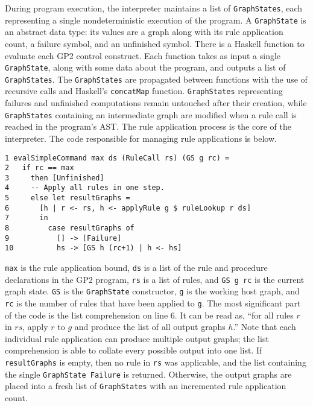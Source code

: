 During program execution, the interpreter maintains a list of \texttt{GraphStates}, each representing a single nondeterministic execution of the program. A \texttt{GraphState} is an abstract data type: its values are a graph along with its rule application count, a failure symbol, and an unfinished symbol. There is a Haskell function to evaluate each GP2 control construct. Each function takes as input a single \texttt{GraphState}, along with some data about the program, and outputs a list of \texttt{GraphStates}. The \texttt{GraphStates} are propagated between functions with the use of recursive calls and Haskell's \texttt{concatMap} function. \texttt{GraphStates} representing failures and unfinished computations remain untouched after their creation, while \texttt{GraphStates} containing an intermediate graph are modified when a rule call is reached in the program's AST. The rule application process is the core of the interpreter. The code responsible for managing rule applications is below.

\begin{verbatim}
1 evalSimpleCommand max ds (RuleCall rs) (GS g rc) = 
2   if rc == max 
3     then [Unfinished]
4     -- Apply all rules in one step.
5     else let resultGraphs = 
6       [h | r <- rs, h <- applyRule g $ ruleLookup r ds] 
7       in
8         case resultGraphs of
9           [] -> [Failure]
10          hs -> [GS h (rc+1) | h <- hs]
\end{verbatim}

\texttt{max} is the rule application bound, \texttt{ds} is a list of the rule and procedure declarations in the GP2 program, \texttt{rs} is a list of rules, and \texttt{GS g rc} is the current graph state. \texttt{GS} is the \texttt{GraphState} constructor, \texttt{g} is the working host graph, and \texttt{rc} is the number of rules that have been applied to \texttt{g}. The most significant part of the code is the list comprehension on line 6. It can be read as, ``for all rules $r$ in $rs$, apply $r$ to $g$ and produce the list of all output graphs $h$.'' Note that each individual rule application can produce multiple output graphs; the list comprehension is able to collate every possible output into one list. If \texttt{resultGraphs} is empty, then no rule in \texttt{rs} was applicable, and the list containing the single \texttt{GraphState Failure} is returned. Otherwise, the output graphs are placed into a fresh list of \texttt{GraphStates} with an incremented rule application count.

